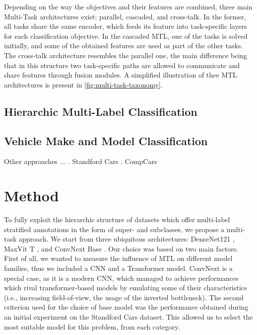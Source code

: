 \documentclass[conference]{IEEEtran}
\begin{document}
Depending on the way the objectives and their features are combined, three main Multi-Task architectures exist: parallel, cascaded, and cross-talk. In the former, all tasks share the same encoder, which feeds its feature into task-specific layers for each classification objective. In the cascaded MTL, one of the tasks is solved initially, and some of the obtained features are used as part of the other tasks. The cross-talk architecture resembles the parallel one, the main difference being that in this structure two task-specific paths are allowed to communicate and share features through fusion modules. A simplified illustration of thee MTL architectures is present in \ref{fig:multi-task-taxonomy}.

\subsection{Hierarchic Multi-Label Classification}

\subsection{Vehicle Make and Model Classification}



Other approaches ... . Standford Cars \cite{krause2015fine}. CompCars \cite{yang2015large}

\section{Method}
\label{sec:methodology}

To fully exploit the hierarchic structure of datasets which offer multi-label stratified annotations in the form of super- and subclasses, we propose a multi-task approach. We start from three ubiquitous architectures: DenseNet121 \cite{huang2017densely}, MaxVit T \cite{tu2022maxvit}, and ConvNext Base \cite{liu2022convnet}. Our choice was based on two main factors. First of all, we wanted to measure the influence of MTL on different model families, thus we included a CNN and a Transformer model. ConvNext is a special case, as it is a modern CNN, which managed to achieve performances which rival transformer-based models by emulating some of their characteristics (i.e., increasing field-of-view, the usage of the inverted bottleneck). The second criterion used for the choice of base model was the performance obtained during an initial experiment on the Standford Cars dataset. This allowed us to select the most suitable model for this problem, from each category.  
\end{document}
